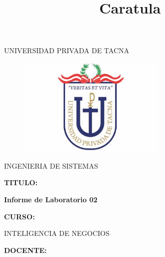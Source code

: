 \documentclass[12pt,letterpaper]{article}
\begin{document}
%


\title{Caratula}

\begin{titlepage}
\begin{center}
\large{UNIVERSIDAD PRIVADA DE TACNA}\\
\vspace*{-0.025in}
\begin{figure}[htb]
\begin{center}
\includegraphics[width=7cm]{./images/logo}
\end{center}
\end{figure}
\vspace*{0.15in}
INGENIERIA DE SISTEMAS  \\

\vspace*{0.3in}
\begin{large}
\textbf{TITULO:} \\
\end{large}

\vspace*{0.1in}
\begin{Large}
\textbf{Informe de Laboratorio 02} \\

\end{Large}

\vspace*{0.3in}
\begin{Large}
\textbf{CURSO:} \\
\end{Large}

\vspace*{0.1in}
\begin{large}
INTELIGENCIA DE NEGOCIOS\\
\end{large}

\vspace*{0.3in}
\begin{Large}
\textbf{DOCENTE:} \\
\end{Large}


\end{center}
\end{titlepage}
\end{document}
